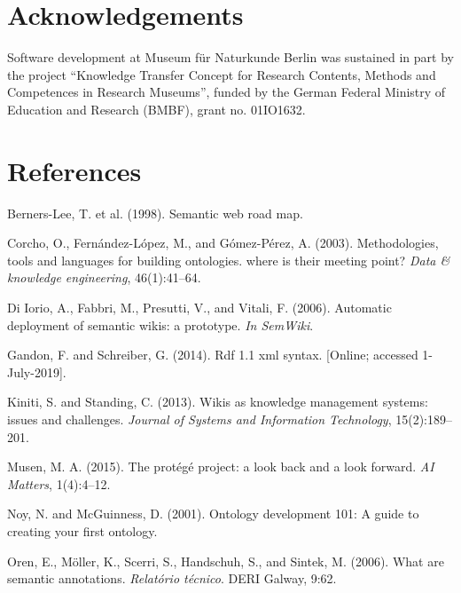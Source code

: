 \documentclass{ijcs_template}
\begin{document}
\section{Acknowledgements}
Software development at Museum f\"ur Naturkunde Berlin was sustained in part by the project ``Knowledge Transfer Concept for Research Contents, Methods and Competences in Research Museums'', funded by the German Federal Ministry of Education and Research (BMBF), grant no. 01IO1632.


\section*{References}
\begin{thebibliography}
Berners-Lee, T. et al. (1998). Semantic web road map.

Corcho, O., Fernández-López, M., and Gómez-Pérez, A. (2003). Methodologies, tools and languages for
building ontologies. where is their meeting point? {\it Data \& knowledge engineering}, 46(1):41–64.

Di Iorio, A., Fabbri, M., Presutti, V., and Vitali, F. (2006). Automatic deployment of semantic wikis: a
prototype. {\it In SemWiki}.

Gandon, F. and Schreiber, G. (2014). Rdf 1.1 xml syntax. [Online; accessed 1-July-2019].

Kiniti, S. and Standing, C. (2013). Wikis as knowledge management systems: issues and challenges.
{\it Journal of Systems and Information Technology}, 15(2):189–201.

Musen, M. A. (2015). The protégé project: a look back and a look forward. {\it AI Matters}, 1(4):4–12.

Noy, N. and McGuinness, D. (2001). Ontology development 101: A guide to creating your first ontology.

Oren, E., Möller, K., Scerri, S., Handschuh, S., and Sintek, M. (2006). What are semantic annotations.
{\it Relatório técnico}. DERI Galway, 9:62.


\end{thebibliography}
\end{document}
